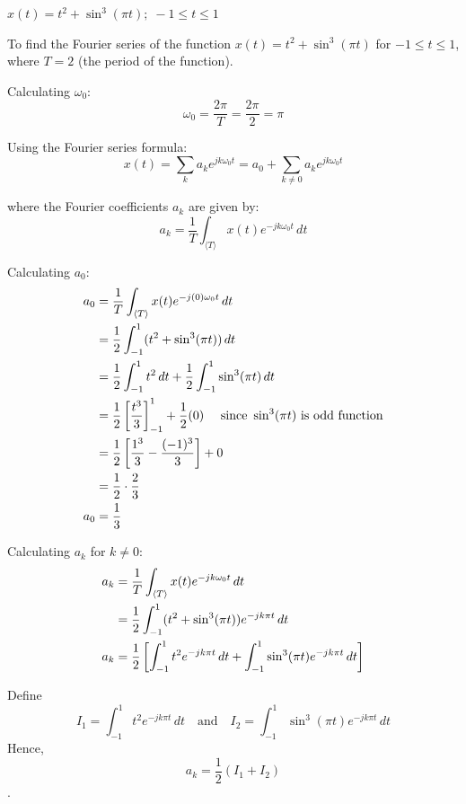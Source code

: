 \documentclass[a4paper, 10pt]{article}
\begin{document}
\begin{tosubmit}
\begin{subproblems}[start=3]
    \item \( x(t) = t^2 + \sin^3(\pi t);\; -1 \leq t \leq 1 \)
\end{subproblems}

\par\noindent\submitsolution
To find the Fourier series of the function \( x(t) = t^2 + \sin^3(\pi t) \) for \( -1 \leq t \leq 1 \), where \( T = 2 \) (the period of the function).

Calculating \( \omega_0 \):
\[ \omega_0 = \frac{2 \pi}{T} = \frac{2 \pi}{2} = \pi \]

Using the Fourier series formula:
\[ x(t) = \sum_{k} a_k e^{j k \omega_0 t} = a_0 + \sum_{k \neq 0} a_k e^{j k \omega_0 t} \]

where the Fourier coefficients \( a_k \) are given by:
\[ a_k = \frac{1}{T} \int_{\langle T \rangle} x(t) e^{-j k \omega_0 t} \,dt \]

Calculating \( a_0 \):
\begin{align*}
    a_0 &= \frac{1}{T} \int_{\langle T \rangle} x(t) e^{-j (0) \omega_0 t} \,dt \\
    &= \frac{1}{2} \int_{-1}^{1} (t^2 + \sin^3(\pi t)) \,dt \\
    &= \frac{1}{2} \int_{-1}^{1} t^2 \,dt + \frac{1}{2} \int_{-1}^{1} \sin^3(\pi t) \,dt \\
    &= \frac{1}{2} \left[ \frac{t^3}{3} \right]_{-1}^{1} + \frac{1}{2} (0) \quad \text{ since } \sin^3(\pi t) \text{ is odd function} \\
    &= \frac{1}{2} \left[ \frac{1^3}{3} - \frac{(-1)^3}{3} \right] + 0 \\
    &= \frac{1}{2} \cdot \frac{2}{3} \\
    a_0 &= \frac{1}{3}
\end{align*}

Calculating \( a_k \) for \( k \neq 0 \):
\begin{align*}
    a_k &= \frac{1}{T} \int_{\langle T \rangle} x(t) e^{-j k \omega_0 t} \,dt \\
    &= \frac{1}{2} \int_{-1}^{1} (t^2 + \sin^3(\pi t)) e^{-j k \pi t} \,dt \\
    a_k &= \frac{1}{2} \left[ \int_{-1}^{1} t^2 e^{-j k \pi t} \,dt + \int_{-1}^{1} \sin^3(\pi t) e^{-j k \pi t} \,dt \right]
\end{align*}

Define \[ I_1 = \int_{-1}^{1} t^2 e^{-j k \pi t} \,dt \quad \text{and} \quad I_2 = \int_{-1}^{1} \sin^3(\pi t) e^{-j k \pi t} \,dt \]
Hence, \[ a_k = \frac{1}{2} (I_1 + I_2) \].


\end{tosubmit}
\end{document}

